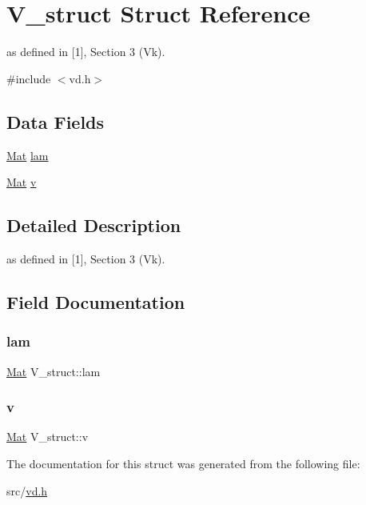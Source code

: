 \hypertarget{structV__struct}{}\section{V\+\_\+struct Struct Reference}
\label{structV__struct}


as defined in \mbox{[}1\mbox{]}, Section 3 (Vk).  




{\ttfamily \#include $<$vd.\+h$>$}

\subsection*{Data Fields}
\begin{DoxyCompactItemize}
\item 
\mbox{\hyperlink{typedefs_8h_a9fa28c1f74e909474857584f5c7b0088}{Mat}} \mbox{\hyperlink{structV__struct_a56d1655953ba5bee519bd62d992abfff}{lam}}
\item 
\mbox{\hyperlink{typedefs_8h_a9fa28c1f74e909474857584f5c7b0088}{Mat}} \mbox{\hyperlink{structV__struct_aa78c83185af94c1df09f59a689881cd9}{v}}
\end{DoxyCompactItemize}


\subsection{Detailed Description}
as defined in \mbox{[}1\mbox{]}, Section 3 (Vk). 

\subsection{Field Documentation}
\mbox{\label{structV__struct_a56d1655953ba5bee519bd62d992abfff}} 
\subsubsection{\texorpdfstring{lam}{lam}}
{\footnotesize\ttfamily \mbox{\hyperlink{typedefs_8h_a9fa28c1f74e909474857584f5c7b0088}{Mat}} V\+\_\+struct\+::lam}

\mbox{\label{structV__struct_aa78c83185af94c1df09f59a689881cd9}} 
\subsubsection{\texorpdfstring{v}{v}}
{\footnotesize\ttfamily \mbox{\hyperlink{typedefs_8h_a9fa28c1f74e909474857584f5c7b0088}{Mat}} V\+\_\+struct\+::v}



The documentation for this struct was generated from the following file\+:\begin{DoxyCompactItemize}
\item 
src/\mbox{\hyperlink{vd_8h}{vd.\+h}}\end{DoxyCompactItemize}
